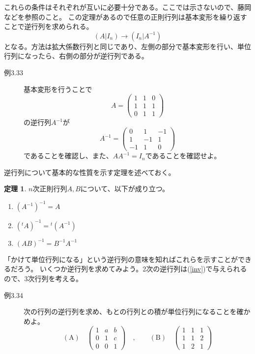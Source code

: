 \documentclass[10pt]{jsreport}
\theoremstyle{definition}%
\newtheorem{thm}{定理}[section]%
\numberwithin{equation}{section}%
\begin{document}
これらの条件はそれぞれが互いに必要十分である。ここでは示さないので、藤岡\cite{L-fujioka}などを参照のこと。
この定理があるので任意の正則行列は基本変形を繰り返すことで逆行列を求められる。
\begin{equation}
  (A|I_{n})\to (I_{n}|A^{-1})
\end{equation}
となる。方法は拡大係数行列と同じであり、左側の部分で基本変形を行い、単位行列になったら、右側の部分が逆行列である。
\begin{description}
  \item[例3.33] 基本変形を行うことで
  \begin{equation}
    A=\begin{pmatrix}
      1 & 1 & 0\\
      1 & 1 & 1 \\
      0 & 1 &1
    \end{pmatrix}
  \end{equation}
  の逆行列$A^{-1}$が
  \begin{equation}
   A^{-1}= \begin{pmatrix}
      0 & 1 & -1\\
      1 & -1 & 1 \\
      -1 & 1 & 0 
    \end{pmatrix}
  \end{equation}
  であることを確認し、また、$AA^{-1}=I_{n}$であることを確認せよ。
\end{description}
逆行列について基本的な性質を示す定理を述べておく。
\begin{screen}
  \begin{thm}
    $n$次正則行列$A,B$について、以下が成り立つ。
    \begin{enumerate}
      \item $(A^{-1})^{-1}=A$
      \item $({}^{t}\!A)^{-1}={}^{t}\!(A^{-1})$
      \item $(AB)^{-1}=B^{-1}A^{-1}$
    \end{enumerate}
  \end{thm}
\end{screen}
「かけて単位行列になる」という逆行列の意味を知ればこれらを示すことができるだろう。
いくつか逆行列を求めてみよう。2次の逆行列は(\ref{inv})で与えられるので、3次行列を考える。
\begin{description}
  \item[例3.34] 次の行列の逆行列を求め、もとの行列との積が単位行列になることを確かめよ。
  \begin{equation}
    (\mathrm{A})\quad \begin{pmatrix}
      1 & a & b\\
      0 & 1 & c \\
      0 & 0 & 1    
    \end{pmatrix}\quad ,\quad \quad
     (\mathrm{B})\quad \begin{pmatrix}
      1 & 1 & 1\\
      1 & 1 & 2 \\
      1 & 2 & 1    
    \end{pmatrix}
  \end{equation}
\end{description}
\end{document}
